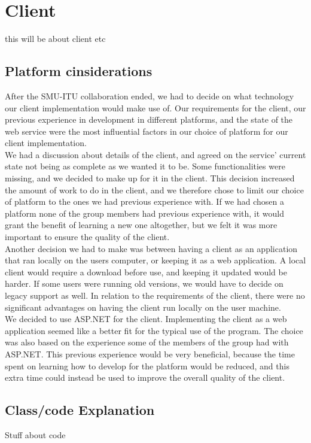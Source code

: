 \documentclass[10pt,a4paper]{article}
\begin{document}
\newpage

\section{Client}
this will be about client etc
\subsection{Platform cinsiderations}
After the SMU-ITU collaboration ended, we had to decide on what technology our client implementation would make use of. Our requirements for the client, our previous experience in development in different platforms, and the state of the web service were the most influential factors in our choice of platform for our client implementation.\\
We had a discussion about details of the client, and agreed on the service’ current state not being as complete as we wanted it to be. Some functionalities were missing, and we decided to make up for it in the client. This decision increased the amount of work to do in the client, and we therefore chose to limit our choice of platform to the ones we had previous experience with. If we had chosen a platform none of the group members had previous experience with, it would grant the benefit of learning a new one altogether, but we felt it was more important to ensure the quality of the client.\\
Another decision we had to make was between having a client as an application that ran locally on the users computer, or keeping it as a web application. A local client would require a download before use, and keeping it updated would be harder. If some users were running old versions, we would have to decide on legacy support as well. In relation to the requirements of the client, there were no significant advantages on having the client run locally on the user machine.\\
We decided to use ASP.NET for the client. Implementing the client as a web application seemed like a better fit for the typical use of the program. The choice was also based on the experience some of the members of the group had with ASP.NET. This previous experience would be very beneficial, because the time spent on learning how to develop for the platform would be reduced, and this extra time could instead be used to improve the overall quality of the client.

\subsection{Class/code Explanation}
Stuff about code
\end{document}
